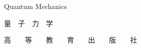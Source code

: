 \begin{center}
		
	  \pskip
	
	\Large{Quantum \quad Mechanics} \par
	\Huge{\heiti 量~~子~~力~~学} \pskip
	
	\normalfont{}
	\normalsize
	
	
	\large {}
	
	\vfill
	\large{高~~~~等~~~~教~~~~育~~~~出~~~~版~~~~社}
	
\end{center}
\normalsize
\thispagestyle{empty}
\clearpage